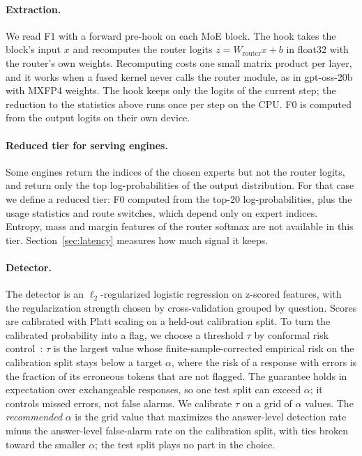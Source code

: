 \documentclass[11pt]{article}
\newcommand{\FZ}{\textsf{F0}}
\newcommand{\FO}{\textsf{F1}}
\begin{document}
\paragraph{Extraction.}
We read \FO{} with a forward pre-hook on each MoE block.
The hook takes the block's input $x$ and recomputes the router logits $z = W_{\text{router}}x + b$ in float32 with the router's own weights.
Recomputing costs one small matrix product per layer, and it works when a fused kernel never calls the router module, as in gpt-oss-20b with MXFP4 weights.
The hook keeps only the logits of the current step; the reduction to the statistics above runs once per step on the CPU.
\FZ{} is computed from the output logits on their own device.

\paragraph{Reduced tier for serving engines.}
Some engines return the indices of the chosen experts but not the router logits, and return only the top log-probabilities of the output distribution.
For that case we define a reduced tier: \FZ{} computed from the top-20 log-probabilities, plus the usage statistics and route switches, which depend only on expert indices.
Entropy, mass and margin features of the router softmax are not available in this tier.
Section~\ref{sec:latency} measures how much signal it keeps.

\paragraph{Detector.}
The detector is an $\ell_2$-regularized logistic regression on z-scored features, with the regularization strength chosen by cross-validation grouped by question.
Scores are calibrated with Platt scaling on a held-out calibration split.
To turn the calibrated probability into a flag, we choose a threshold $\tau$ by conformal risk control~\citep{angelopoulos2024conformal}: $\tau$ is the largest value whose finite-sample-corrected empirical risk on the calibration split stays below a target $\alpha$, where the risk of a response with errors is the fraction of its erroneous tokens that are not flagged.
The guarantee holds in expectation over exchangeable responses, so one test split can exceed $\alpha$; it controls missed errors, not false alarms.
We calibrate $\tau$ on a grid of $\alpha$ values.
The \emph{recommended} $\alpha$ is the grid value that maximizes the answer-level detection rate minus the answer-level false-alarm rate on the calibration split, with ties broken toward the smaller $\alpha$; the test split plays no part in the choice.
\end{document}
